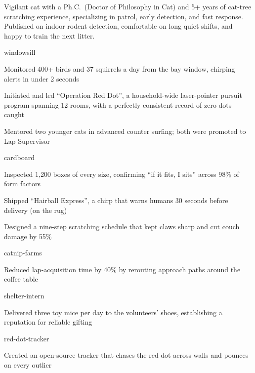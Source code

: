 \documentclass{resume}
\begin{document}
\begin{summary}
  Vigilant cat with a Ph.C.\ (Doctor of Philosophy in Cat) and 5+ years of cat-tree scratching experience, specializing in patrol, early detection, and fast response. Published on indoor rodent detection, comfortable on long quiet shifts, and happy to train the next litter.
\end{summary}

\begin{experience}
  \begin{role}{windowsill}
    \item Monitored 400+ birds and 37 squirrels a day from the bay window, chirping alerts in under 2 seconds
    \item Initiated and led ``Operation Red Dot'', a household-wide laser-pointer pursuit program spanning 12 rooms, with a perfectly consistent record of zero dots caught
    \item Mentored two younger cats in advanced counter surfing; both were promoted to Lap Supervisor
  \end{role}
  \begin{role}{cardboard}
    \item Inspected 1,200 boxes of every size, confirming ``if it fits, I sits'' across 98\% of form factors
    \item Shipped ``Hairball Express'', a chirp that warns humans 30 seconds before delivery (on the rug)
    \item Designed a nine-step scratching schedule that kept claws sharp and cut couch damage by 55\%
  \end{role}
  \begin{role}{catnip-farms}
    \item Reduced lap-acquisition time by 40\% by rerouting approach paths around the coffee table
  \end{role}
  \begin{role}{shelter-intern}
    \item Delivered three toy mice per day to the volunteers' shoes, establishing a reputation for reliable gifting
  \end{role}
\end{experience}

\begin{projects}
  \begin{project}{red-dot-tracker}
    \item Created an open-source tracker that chases the red dot across walls and pounces on every outlier
  \end{project}
\end{projects}

\education[dissertation]

\end{document}
